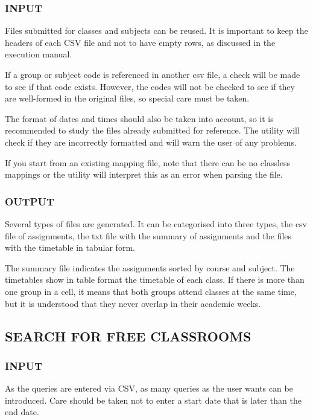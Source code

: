 \subsubsection*{INPUT}

Files submitted for classes and subjects can be reused. It is important to keep the headers of each CSV file and not to have empty rows, as discussed in the execution manual. 

If a group or subject code is referenced in another csv file, a check will be made to see if that code exists. However, the codes will not be checked to see if they are well-formed in the original files, so special care must be taken.

The format of dates and times should also be taken into account, so it is recommended to study the files already submitted for reference. The utility will check if they are incorrectly formatted and will warn the user of any problems.

If you start from an existing mapping file, note that there can be no classless mappings or the utility will interpret this as an error when parsing the file.


\subsubsection*{OUTPUT}

Several types of files are generated. It can be categorised into three types, the csv file of assignments, the txt file with the summary of assignments and the files with the timetable in tabular form.

The summary file indicates the assignments sorted by course and subject. The timetables show in table format the timetable of each class. If there is more than one group in a cell, it means that both groups attend classes at the same time, but it is understood that they never overlap in their academic weeks.


\subsection*{SEARCH FOR FREE CLASSROOMS}


\subsubsection*{INPUT}

As the queries are entered via CSV, as many queries as the user wants can be introduced. Care should be taken not to enter a start date that is later than the end date.

